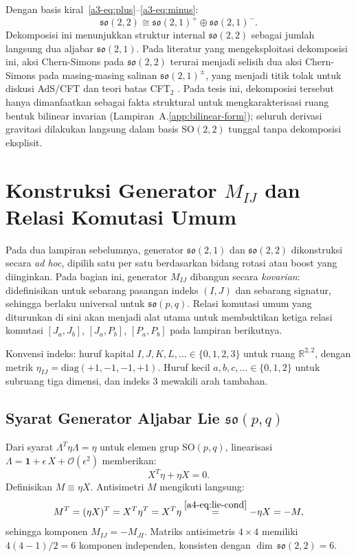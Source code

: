 Dengan basis kiral~\eqref{a3-eq:plus}--\eqref{a3-eq:minus}:
\begin{equation}\label{a3-eq:decomposition}
    \mathfrak{so}(2,2) \cong \mathfrak{so}(2,1)^+ \oplus \mathfrak{so}(2,1)^-.
\end{equation}
Dekomposisi ini menunjukkan struktur internal $\mathfrak{so}(2,2)$ sebagai jumlah langsung dua aljabar $\mathfrak{so}(2,1)$. Pada literatur yang mengeksploitasi dekomposisi ini, aksi Chern-Simons pada $\mathfrak{so}(2,2)$ terurai menjadi selisih dua aksi Chern-Simons pada masing-masing salinan $\mathfrak{so}(2,1)^\pm$, yang menjadi titik tolak untuk diskusi AdS/CFT dan teori batas CFT$_2$ \cite{witten1988, achucarro1986}. Pada tesis ini, dekomposisi tersebut hanya dimanfaatkan sebagai fakta struktural untuk mengkarakterisasi ruang bentuk bilinear invarian (Lampiran~A.\ref{app:bilinear-form}); seluruh derivasi gravitasi dilakukan langsung dalam basis $\mathrm{SO}(2,2)$ tunggal tanpa dekomposisi eksplisit.

\section{Konstruksi Generator $M_{IJ}$ dan Relasi Komutasi Umum}
\label{app:generator-construction}

Pada dua lampiran sebelumnya, generator $\mathfrak{so}(2,1)$ dan $\mathfrak{so}(2,2)$ dikonstruksi secara \emph{ad hoc}, dipilih satu per satu berdasarkan bidang rotasi atau boost yang diinginkan. Pada bagian ini, generator $M_{IJ}$ dibangun secara \emph{kovarian}: didefinisikan untuk sebarang pasangan indeks $(I,J)$ dan sebarang signatur, sehingga berlaku universal untuk $\mathfrak{so}(p,q)$. Relasi komutasi umum yang diturunkan di sini akan menjadi alat utama untuk membuktikan ketiga relasi komutasi $[J_a,J_b]$, $[J_a,P_b]$, $[P_a,P_b]$ pada lampiran berikutnya.

Konvensi indeks: huruf kapital $I, J, K, L, \ldots \in \{0,1,2,3\}$ untuk ruang $\mathbb{R}^{2,2}$, dengan metrik $\eta_{IJ} = \mathrm{diag}(+1,-1,-1,+1)$. Huruf kecil $a, b, c, \ldots \in \{0,1,2\}$ untuk subruang tiga dimensi, dan indeks 3 mewakili arah tambahan.

\subsection{Syarat Generator Aljabar Lie $\mathfrak{so}(p,q)$}

Dari syarat $\Lambda^T\eta\Lambda = \eta$ untuk elemen grup $\mathrm{SO}(p,q)$, linearisasi $\Lambda = \mathbf{1} + \epsilon\,X + \mathcal{O}(\epsilon^2)$ memberikan:
\begin{equation}\label{a4-eq:lie-cond}
    X^T\eta + \eta X = 0.
\end{equation}
Definisikan $M \equiv \eta X$. Antisimetri $M$ mengikuti langsung:
\begin{equation}
    M^T = (\eta X)^T = X^T\eta^T = X^T\eta \stackrel{\eqref{a4-eq:lie-cond}}{=} -\eta X = -M,
\end{equation}
sehingga komponen $M_{IJ} = -M_{JI}$. Matriks antisimetris $4 \times 4$ memiliki $4(4-1)/2 = 6$ komponen independen, konsisten dengan $\dim\,\mathfrak{so}(2,2) = 6$.

